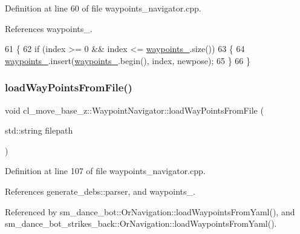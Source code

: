 Definition at line 60 of file waypoints\+\_\+navigator.\+cpp.



References waypoints\+\_\+.


\begin{DoxyCode}
61 \{
62   \textcolor{keywordflow}{if} (index >= 0 && index <= \hyperlink{classcl__move__base__z_1_1WaypointNavigator_a727f6a73e15ff5dc6bb3ffdf52c3d832}{waypoints\_}.size())
63   \{
64     \hyperlink{classcl__move__base__z_1_1WaypointNavigator_a727f6a73e15ff5dc6bb3ffdf52c3d832}{waypoints\_}.insert(\hyperlink{classcl__move__base__z_1_1WaypointNavigator_a727f6a73e15ff5dc6bb3ffdf52c3d832}{waypoints\_}.begin(), index, newpose);
65   \}
66 \}
\end{DoxyCode}
\mbox{\label{classcl__move__base__z_1_1WaypointNavigator_a18d74467ddf0e637a8d5a6e1fa2e93db}} 
\subsubsection{\texorpdfstring{load\+Way\+Points\+From\+File()}{loadWayPointsFromFile()}}
{\footnotesize\ttfamily void cl\+\_\+move\+\_\+base\+\_\+z\+::\+Waypoint\+Navigator\+::load\+Way\+Points\+From\+File (\begin{DoxyParamCaption}\item[{std\+::string}]{filepath }\end{DoxyParamCaption})}



Definition at line 107 of file waypoints\+\_\+navigator.\+cpp.



References generate\+\_\+debs\+::parser, and waypoints\+\_\+.



Referenced by sm\+\_\+dance\+\_\+bot\+::\+Or\+Navigation\+::load\+Waypoints\+From\+Yaml(), and sm\+\_\+dance\+\_\+bot\+\_\+strikes\+\_\+back\+::\+Or\+Navigation\+::load\+Waypoints\+From\+Yaml().


